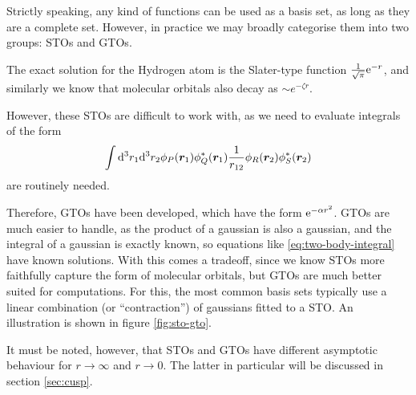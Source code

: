 Strictly speaking, any kind of functions can be used as a basis set, as long as they are a complete set. However, in practice we may broadly categorise them into two groups: \glspl{STO} and \glspl{GTO}.

The exact solution for the Hydrogen atom is the Slater-type function $\frac 1{\sqrt{\pi}} \mathrm{e}^{-r}$, and similarly we know that molecular orbitals also decay as $\sim e^{-\zeta r}$.

However, these \glspl{STO} are difficult to work with, as we need to evaluate integrals of the form
\begin{equation}
    \label{eq:two-body-integral}
\int\mathrm{d}^3r_1\mathrm{d}^3r_2 \phi_P(\bm r_1)\phi_Q^*(\bm r_1)\frac 1 {r_{12}}\phi_R(\bm r_2)\phi_S^*(\bm r_2)
\end{equation}
are routinely needed.

Therefore, \glspl{GTO} have been developed,\cite{boysElectronic1950} which have the form $\mathrm{e}^{-\alpha r^2}$. \glspl{GTO} are much easier to handle, as the product of a gaussian is also a gaussian, and the integral of a gaussian is exactly known, so equations like \eqref{eq:two-body-integral} have known solutions. With this comes a tradeoff, since we know \glspl{STO} more faithfully capture the form of molecular orbitals, but \glspl{GTO} are much better suited for computations. For this, the most common basis sets typically use a linear combination (or ``contraction'') of gaussians fitted to a \gls{STO}. An illustration is shown in figure \ref{fig:sto-gto}.

It must be noted, however, that \glspl{STO} and \glspl{GTO} have different asymptotic behaviour for $r\to\infty$ and $r\to 0$. The latter in particular will be discussed in section \ref{sec:cusp}.

